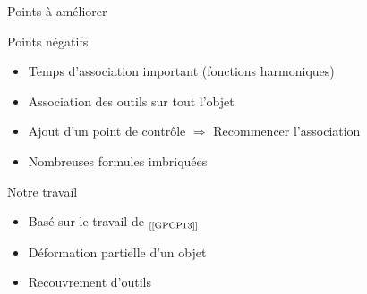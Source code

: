 \documentclass[xcolor=x11names,compress]{beamer}
\renewcommand{\(}{\begin{columns}} \renewcommand{\)}{\end{columns}}
\newcommand{\<}[1]{\begin{column}{#1}} \renewcommand{\>}{\end{column}}
\begin{document}
\begin{frame}{Points à améliorer}
  \begin{alertblock}{Points négatifs}
    \begin{itemize}
      \item Temps d'association important (fonctions harmoniques)
      \item Association des outils sur tout l'objet
      \item Ajout d'un point de contrôle $\Rightarrow$ Recommencer
      l'association
      \item Nombreuses formules imbriquées
    \end{itemize}
  \end{alertblock}
  \begin{block}{Notre travail}
    \begin{itemize}
      \item Basé sur le travail de $_{[\text{\cite{GPCP13}}]}$
      \item Déformation partielle d'un objet
      \item Recouvrement d'outils
    \end{itemize}
  \end{block}
\end{frame}
\end{document}
